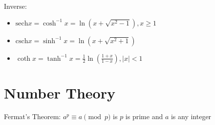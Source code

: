 \documentclass[10pt,a4paper,oneside]{book}
\begin{document}
Inverse: 
\begin{itemize}
    \item $\text{sech}x = \cosh^{-1}x = \ln(x+\sqrt{x^2-1}), x\geq 1$
    \item $\text{csch}x = \sinh^{-1}x = \ln(x+\sqrt{x^2+1})$
    \item $\coth x = \tanh^{-1}x = \frac{1}{2}\ln\left(\frac{1+x}{1-x}\right), |x|<1$
\end{itemize}

\section*{Number Theory}
Fermat's Theorem: $a^p \equiv a \pmod{p}$ is $p$ is prime and $a$ is any integer 
\end{document}
